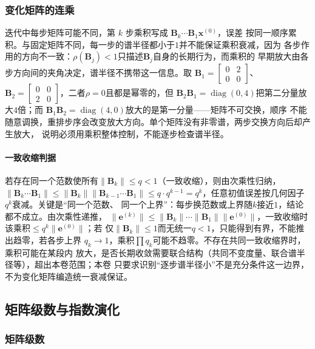 \subsubsection{变化矩阵的连乘}

迭代中每步矩阵可能不同，第 $k$ 步乘积写成 $\bm B_k\cdots\bm B_1\bm x^{(0)}$，误差
按同一顺序累积。与固定矩阵不同，每一步的谱半径都小于$1$并不能保证乘积衰减，因为
各步作用的方向不一致：$\rho(\bm B_j)<1$只描述$\bm B_j$自身的长期行为，而乘积的
早期放大由各步方向间的夹角决定，谱半径不携带这一信息。取
$\bm B_1=\begin{bmatrix}0&2\\0&0\end{bmatrix}$、
$\bm B_2=\begin{bmatrix}0&0\\2&0\end{bmatrix}$，二者$\rho=0$且都是幂零的，但
$\bm B_2\bm B_1=\operatorname{diag}(0,4)$把第二分量放大$4$倍；而
$\bm B_1\bm B_2=\operatorname{diag}(4,0)$放大的是第一分量——矩阵不可交换，顺序
不能随意调换，重排步序会改变放大方向。单个矩阵没有非零谱，两步交换方向后却产生放大，
说明必须用乘积整体控制，不能逐步检查谱半径。

\paragraph{一致收缩判据}

若存在同一个范数使所有$\lVert\bm B_k\rVert\leq q<1$（一致收缩），则由次乘性归纳，
$\lVert\bm B_k\cdots\bm B_1\rVert\leq\lVert\bm B_k\rVert\lVert\bm B_{k-1}\cdots\bm B_1\rVert
\leq q\cdot q^{k-1}=q^k$，任意初值误差按几何因子$q^k$衰减。关键是“同一个范数、
同一个上界”：每步换范数或上界随$k$接近$1$，结论都不成立。由次乘性递推，
$\lVert\bm e^{(k)}\rVert\leq\lVert\bm B_k\rVert\cdots\lVert\bm B_1\rVert
\lVert\bm e^{(0)}\rVert$，一致收缩时该乘积$\leq q^k\lVert\bm e^{(0)}\rVert$；若
仅$\lVert\bm B_k\rVert\leq1$而无统一$q<1$，只能得到有界，不能推出趋零，若各步上界
$q_k\to1$，乘积$\prod q_k$可能不趋零。不存在共同一致收缩界时，乘积可能在某段内
放大，是否长期收敛需要联合结构（共同不变度量、联合谱半径等），超出本卷范围；本卷
只要求识别“逐步谱半径小”不是充分条件这一边界，不为变化矩阵编造统一衰减保证。

\subsection{矩阵级数与指数演化}
\label{sec:ls-matrix-series-exponential}

\subsubsection{矩阵级数}


